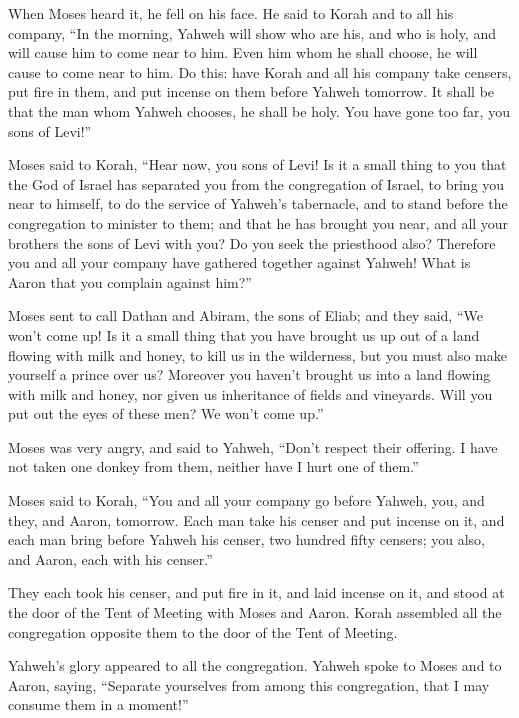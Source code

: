  When Moses heard it, he fell on his face.  He
said to Korah and to all his company, ``In the morning, Yahweh will show
who are his, and who is holy, and will cause him to come near to him.
Even him whom he shall choose, he will cause to come near to him.
 Do this: have Korah and all his company take censers,
 put fire in them, and put incense on them before Yahweh
tomorrow. It shall be that the man whom Yahweh chooses, he shall be
holy. You have gone too far, you sons of Levi!''

 Moses said to Korah, ``Hear now, you sons of Levi!
 Is it a small thing to you that the God of Israel has
separated you from the congregation of Israel, to bring you near to
himself, to do the service of Yahweh's tabernacle, and to stand before
the congregation to minister to them;  and that he has
brought you near, and all your brothers the sons of Levi with you? Do
you seek the priesthood also?  Therefore you and all your
company have gathered together against Yahweh! What is Aaron that you
complain against him?''

 Moses sent to call Dathan and Abiram, the sons of Eliab;
and they said, ``We won't come up!  Is it a small thing
that you have brought us up out of a land flowing with milk and honey,
to kill us in the wilderness, but you must also make yourself a prince
over us?  Moreover you haven't brought us into a land
flowing with milk and honey, nor given us inheritance of fields and
vineyards. Will you put out the eyes of these men? We won't come up.''

 Moses was very angry, and said to Yahweh, ``Don't respect
their offering. I have not taken one donkey from them, neither have I
hurt one of them.''

 Moses said to Korah, ``You and all your company go before
Yahweh, you, and they, and Aaron, tomorrow.  Each man take
his censer and put incense on it, and each man bring before Yahweh his
censer, two hundred fifty censers; you also, and Aaron, each with his
censer.''

 They each took his censer, and put fire in it, and laid
incense on it, and stood at the door of the Tent of Meeting with Moses
and Aaron.  Korah assembled all the congregation opposite
them to the door of the Tent of Meeting.

Yahweh's glory appeared to all the congregation.  Yahweh
spoke to Moses and to Aaron, saying,  ``Separate yourselves
from among this congregation, that I may consume them in a moment!''

